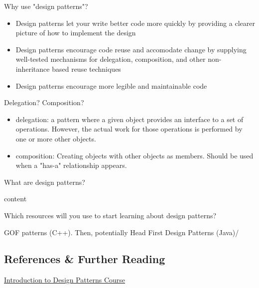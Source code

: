 \begin{quest}
\item Why use "design patterns"?
\begin{ans}
\begin{itemize}
	\item Design patterns let your write better code more quickly by providing a clearer picture of how to implement the design
	\item Design patterns encourage code reuse and accomodate change by supplying well-tested mechanisms for delegation, composition, and other non-inheritance based reuse techniques
	\item Design patterns encourage more legible and maintainable code
\end{itemize}
\end{ans}

\item Delegation? Composition?
\begin{ans}
\begin{itemize}
	\item delegation: a pattern where a given object provides an interface to a set of operations. However, the actual work for those operations is performed by one or more other objects.
	\item composition: Creating objects with other objects as members. Should be used when a "has-a" relationship appears.
\end{itemize}
\end{ans}

\item What are design patterns?
\begin{ans}
	content

\end{ans}

\item Which resources will you use to start learning about design patterns?
\begin{ans}
	GOF patterns (C++). Then, potentially Head First Design Patterns (Java)/
\end{ans}


\end{quest}

\subsection{References \& Further Reading}

\href{https://www.gofpatterns.com/design-patterns/module1/intro-design-patterns.php}{Introduction to Design Patterns Course}



